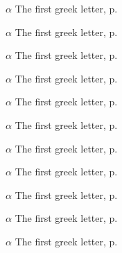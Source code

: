 \begin{eqlist}
    \item[$\alpha$]
    The first greek letter, p.~\pageref{ChX-figure: FigureLabel5}

    \item[$\alpha$]
    The first greek letter, p.~\pageref{ChX-figure: FigureLabel6}

    \item[$\alpha$]
    The first greek letter, p.~\pageref{ChX-figure: FigureLabel7}

    \item[$\alpha$]
    The first greek letter, p.~\pageref{ChX-figure: FigureLabel8}

    \item[$\alpha$]
    The first greek letter, p.~\pageref{ChX-figure: FigureLabel3}

    \item[$\alpha$]
    The first greek letter, p.~\pageref{ChX-figure: FigureLabel3}

    \item[$\alpha$]
    The first greek letter, p.~\pageref{ChX-figure: FigureLabel3}

    \item[$\alpha$]
    The first greek letter, p.~\pageref{ChX-figure: FigureLabel3}

    \item[$\alpha$]
    The first greek letter, p.~\pageref{ChX-figure: FigureLabel3}

    \item[$\alpha$]
    The first greek letter, p.~\pageref{ChX-figure: FigureLabel3}

    \item[$\alpha$]
    The first greek letter, p.~\pageref{ChX-figure: FigureLabel3}

\end{eqlist}